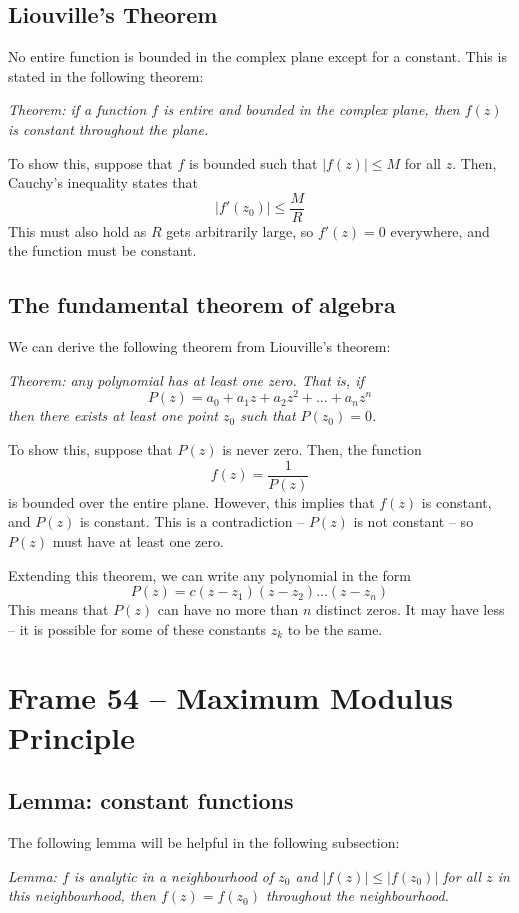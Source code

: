 \documentclass{article}
\begin{document}
\subsection{Liouville's Theorem}
No entire function is bounded in the complex plane except for a constant. This is stated in the following theorem:

\textit{Theorem: if a function $f$ is entire and bounded in the complex plane, then $f(z)$ is constant throughout the plane.}

To show this, suppose that $f$ is bounded such that $|f(z)| \le M$ for all $z$. Then, Cauchy's inequality states that
\[
	|f'(z_0)| \le \frac{M}{R}
\]
This must also hold as $R$ gets arbitrarily large, so $f'(z) = 0$ everywhere, and the function must be constant. 

\subsection{The fundamental theorem of algebra}
We can derive the following theorem from Liouville's theorem:

\textit{Theorem: any polynomial has at least one zero. That is, if
\[
	P(z) = a_0 + a_1 z + a_2 z^2 + \dots + a_n z^n
\]
then there exists at least one point $z_0$ such that $P(z_0) = 0$.}

To show this, suppose that $P(z)$ is never zero. Then, the function
\[
	f(z) = \frac{1}{P(z)}
\]
is bounded over the entire plane. However, this implies that $f(z)$ is constant, and $P(z)$ is constant. This is a contradiction -- $P(z)$ is not constant -- so $P(z)$ must have at least one zero.

Extending this theorem, we can write any polynomial in the form
\[
	P(z) = c(z - z_1)(z - z_2) \dots (z - z_n)
\]
This means that $P(z)$ can have no more than $n$ distinct zeros. It may have less -- it is possible for some of these constants $z_k$ to be the same.


\clearpage
\section{Frame 54 -- Maximum Modulus Principle}
\subsection{Lemma: constant functions}
The following lemma will be helpful in the following subsection:

\textit{Lemma: $f$ is analytic in a neighbourhood of $z_0$ and $|f(z)| \le |f(z_0)|$ for all $z$ in this neighbourhood, then $f(z) = f(z_0)$ throughout the neighbourhood.}
\end{document}
